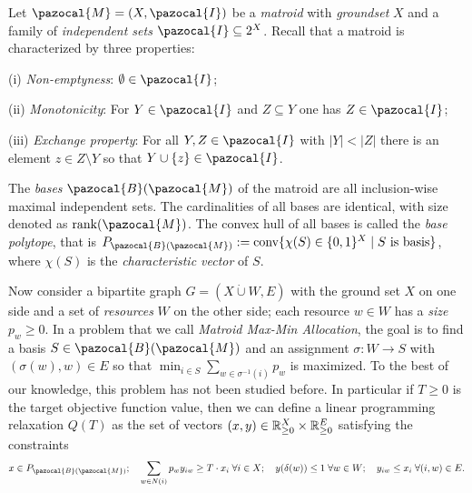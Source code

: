 Let $\pazocal{M} = (X,\pazocal{I})$ be a \emph{matroid} with \emph{groundset} $X$ and 
a family of \emph{independent sets} $\pazocal{I} \subseteq 2^X$. Recall that 
a matroid is characterized by three properties: 
\begin{enumerate*}
\item[(i)] \emph{Non-emptyness}: $\emptyset \in \pazocal{I}$; 
\item[(ii)] \emph{Monotonicity}: For $Y \in \pazocal{I}$ and $Z \subseteq Y$ one has $Z \in \pazocal{I}$; 
\item[(iii)] \emph{Exchange property}: For all $Y,Z \in \pazocal{I}$ with $|Y| < |Z|$ there is an element $z \in Z \setminus Y$ so that $Y \cup \{ z\} \in \pazocal{I}$.
\end{enumerate*}
The \emph{bases} $\pazocal{B}(\pazocal{M})$ of the matroid are all inclusion-wise maximal independent sets. The cardinalities of 
all bases are identical, with size denoted as $\textrm{rank}(\pazocal{M})$.
The convex hull of all bases is called the \emph{base polytope}, that is $P_{\pazocal{B}(\pazocal{M})} := \textrm{conv}\{ \chi(S) \in \{0,1\}^X \mid S\textrm{ is basis}\}$,
where $\chi(S)$ is the \emph{characteristic vector} of $S$.


Now consider a bipartite graph $G = (X \dot{\cup} W,E)$ with the ground set $X$ on one side and
a set of \emph{resources} $W$ on the other side; each resource  $w \in W$ has
a \emph{size}  $p_w \geq 0$. 
In a problem that we call \emph{Matroid Max-Min Allocation}, 
the goal is to find a basis $S \in \pazocal{B}(\pazocal{M})$ and an 
assignment $\sigma : W \to S$ with $(\sigma(w),w) \in E$ so that $\min_{i \in S} \sum_{w \in \sigma^{-1}(i)} p_w$ is maximized. 
To the best of our knowledge, this problem has not been studied before.
In particular if $T \geq 0$ is the target objective function value, then 
we can define a linear programming relaxation $Q(T)$ as the set of vectors $(x,y) \in \mathbb{R}_{\geq 0}^X \times \mathbb{R}_{\geq 0}^E$
satisfying the constraints
\begin{eqnarray*}
 x \in P_{\pazocal{B}(\pazocal{M})}; \quad 
 \sum_{w \in N(i)} p_wy_{iw} \geq T \cdot x_i \;  \forall i \in X; \quad  y(\delta(w)) \leq 1 \; \forall w \in W; \quad y_{iw} \leq x_i \; \forall (i,w) \in E.
\end{eqnarray*} 

